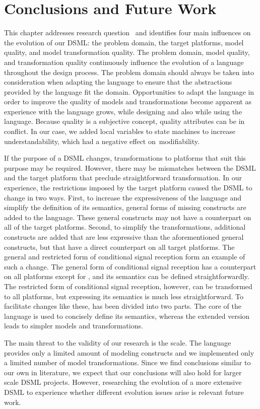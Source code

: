\section{Conclusions and Future Work}
\label{sec:iterative-dsl-evolution:Conclusions}
This chapter addresses research question~ and identifies four main influences on the evolution of our DSML: the problem domain, the target platforms, model quality, and model transformation quality.
The problem domain, model quality, and transformation quality continuously influence the evolution of a language throughout the design process.
The problem domain should always be taken into consideration when adapting the language to ensure that the abstractions provided by the language fit the domain.
Opportunities to adapt the language in order to improve the quality of models and transformations become apparent as experience with the language grows, while designing and also while using the language.
Because quality is a subjective concept, quality attributes can be in conflict.
In our case, we added local variables to state machines to increase understandability, which had a negative effect on~modifiability.

If the purpose of a DSML changes, transformations to platforms that suit this purpose may be required.
However, there may be mismatches between the DSML and the target platform that preclude straightforward transformation.
In our experience, the restrictions imposed by the target platform caused the DSML to change in two ways.
First, to increase the expressiveness of the language and simplify the definition of its semantics, general forms of missing constructs are added to the language.
These general constructs may not have a counterpart on all of the target platforms.
Second, to simplify the transformations, additional constructs are added that are less expressive than the aforementioned general constructs, but that have a direct counterpart on all target platforms.
The general and restricted form of conditional signal reception form an example of such a change.
The general form of conditional signal reception has a counterpart on all platforms except for \Spin, and its semantics can be defined straightforwardly.
The restricted form of conditional signal reception, however, can be transformed to all platforms, but expressing its semantics is much less straightforward.
To facilitate changes like these, \SLCO has been divided into two parts.
The core of the language is used to concisely define its semantics, whereas the extended version leads to simpler models and transformations.


The main threat to the validity of our research is the scale.
The language provides only a limited amount of modeling constructs and we implemented only a limited number of model transformations.
Since we find conclusions similar to our own in literature, we expect that our conclusions will also hold for larger scale DSML projects.
However, researching the evolution of a more extensive DSML to experience whether different evolution issues arise is relevant future work. 